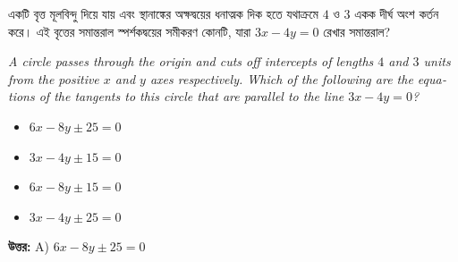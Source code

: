 \documentclass[12pt, a4paper]{article}
\begin{document}
\begin{tcolorbox}[questionbox={প্রশ্ন (Question) 19}]
    \noindent
    একটি বৃত্ত মূলবিন্দু দিয়ে যায় এবং স্থানাঙ্কের অক্ষদ্বয়ের ধনাত্মক দিক হতে যথাক্রমে $4$ ও $3$ একক দীর্ঘ অংশ কর্তন করে। এই বৃত্তের সমান্তরাল স্পর্শকদ্বয়ের সমীকরণ কোনটি, যারা $3x - 4y = 0$ রেখার সমান্তরাল?
    
    \vspace{0.8em}
    \begin{english}
    \noindent\textit{\color{darkgray}
    A circle passes through the origin and cuts off intercepts of lengths $4$ and $3$ units from the positive $x$ and $y$ axes respectively. Which of the following are the equations of the tangents to this circle that are parallel to the line $3x - 4y = 0$?
    }
    \end{english}
\end{tcolorbox}

\vspace{1em}
\begin{itemize}[label={}, leftmargin=1cm, itemsep=0.5em]
    \item[\textbf{A)}] $6x - 8y \pm 25 = 0$
    \item[\textbf{B)}] $3x - 4y \pm 15 = 0$
    \item[\textbf{C)}] $6x - 8y \pm 15 = 0$
    \item[\textbf{D)}] $3x - 4y \pm 25 = 0$
\end{itemize}

\vspace{0.5em}
\begin{tcolorbox}[answerbox]
    \textbf{\color{success} উত্তর:} A) $6x - 8y \pm 25 = 0$
\end{tcolorbox}
\vspace{1em}
\end{document}
